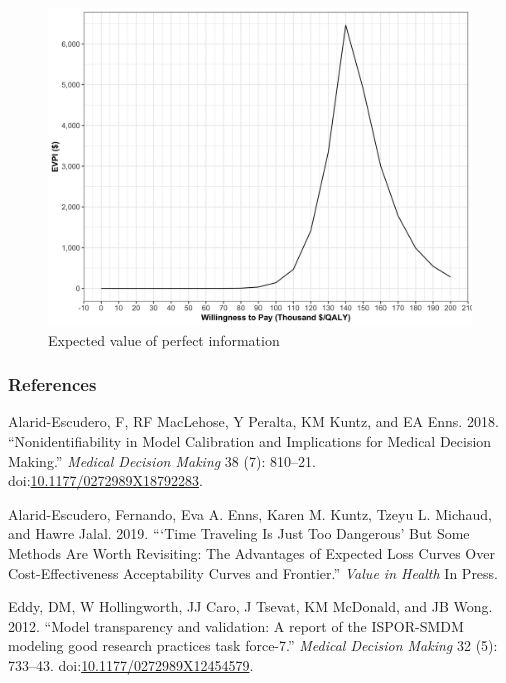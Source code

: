 \documentclass[]{article}
\begin{document}
\begin{figure}
\centering
\includegraphics{../figs/05c_evpi.png}
\caption{Expected value of perfect information \label{fig:05c_evpi}}
\end{figure}

\subsubsection*{References}\label{references}

\hypertarget{refs}{}
\hypertarget{ref-Alarid-Escudero2018b}{}
Alarid-Escudero, F, RF MacLehose, Y Peralta, KM Kuntz, and EA Enns.
2018. ``Nonidentifiability in Model Calibration and Implications for
Medical Decision Making.'' \emph{Medical Decision Making} 38 (7):
810--21.
doi:\href{https://doi.org/10.1177/0272989X18792283}{10.1177/0272989X18792283}.

\hypertarget{ref-Alarid-Escudero2019}{}
Alarid-Escudero, Fernando, Eva A. Enns, Karen M. Kuntz, Tzeyu L.
Michaud, and Hawre Jalal. 2019. ```Time Traveling Is Just Too Dangerous'
But Some Methods Are Worth Revisiting: The Advantages of Expected Loss
Curves Over Cost-Effectiveness Acceptability Curves and Frontier.''
\emph{Value in Health} In Press.

\hypertarget{ref-Eddy2012}{}
Eddy, DM, W Hollingworth, JJ Caro, J Tsevat, KM McDonald, and JB Wong.
2012. ``Model transparency and validation: A report of the ISPOR-SMDM
modeling good research practices task force-7.'' \emph{Medical Decision
Making} 32 (5): 733--43.
doi:\href{https://doi.org/10.1177/0272989X12454579}{10.1177/0272989X12454579}.
\end{document}
